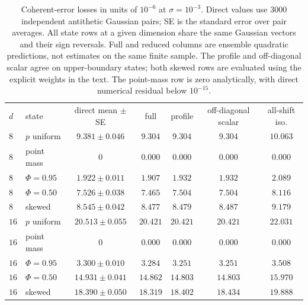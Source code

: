 \begin{table}[!htbp]
\centering
\begin{ruledtabular}
\begin{tabular}{llccccc}
$d$ & state & direct mean $\pm$ SE & full & profile & off-diagonal scalar & all-shift iso.\\
\colrule
$8$ & $p$ uniform & $9.381\pm0.046$ & $9.304$ & $9.304$ & $9.304$ & $10.063$\\
$8$ & point mass & $0$ & $0.000$ & $0.000$ & $0.000$ & $0.000$\\
$8$ & $\Phi=0.95$ & $1.922\pm0.011$ & $1.907$ & $1.932$ & $1.932$ & $2.089$\\
$8$ & $\Phi=0.50$ & $7.526\pm0.038$ & $7.465$ & $7.504$ & $7.504$ & $8.116$\\
$8$ & skewed & $8.545\pm0.042$ & $8.477$ & $8.479$ & $8.487$ & $9.179$\\
$16$ & $p$ uniform & $20.513\pm0.055$ & $20.421$ & $20.421$ & $20.421$ & $22.031$\\
$16$ & point mass & $0$ & $0.000$ & $0.000$ & $0.000$ & $0.000$\\
$16$ & $\Phi=0.95$ & $3.300\pm0.010$ & $3.284$ & $3.251$ & $3.251$ & $3.508$\\
$16$ & $\Phi=0.50$ & $14.931\pm0.041$ & $14.862$ & $14.803$ & $14.803$ & $15.970$\\
$16$ & skewed & $18.390\pm0.050$ & $18.319$ & $18.402$ & $18.434$ & $19.888$\\
\end{tabular}
\end{ruledtabular}
\caption{Coherent-error losses in units of $10^{-6}$ at $\sigma=10^{-3}$. Direct values use $3000$ independent antithetic Gaussian pairs; SE is the standard error over pair averages. All state rows at a given dimension share the same Gaussian vectors and their sign reversals. Full and reduced columns are ensemble quadratic predictions, not estimates on the same finite sample. The profile and off-diagonal scalar agree on upper-boundary states; both skewed rows are evaluated using the explicit weights in the text. The point-mass row is zero analytically, with direct numerical residual below $10^{-15}$.}
\label{tab:reck}
\end{table}
